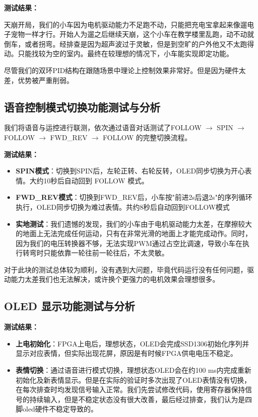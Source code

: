 \documentclass[12pt,a4paper]{ctexart}
\begin{document}
\textbf{测试结果：}

天崩开局，我们的小车因为电机驱动能力不足跑不动，只能把充电宝拿起来像遛电子宠物一样才行。开始人为遛之后继续天崩，这个小车在教学楼里乱跑，动不动就倒车，或者拐弯。经排查是因为超声波过于灵敏，但是到空旷的户外他又不太跑得动。只能找较为空的室内。最终在较理想的情况下，小车能实现即定功能。

尽管我们的双环PID结构在跟随场景中理论上控制效果非常好。但是因为硬件太差，优势被严重削弱。

\subsection{语音控制模式切换功能测试与分析}

我们将语音与运控进行联测，依次通过语音对话测试了FOLLOW $\to$ SPIN $\to$ FOLLOW $\to$ FWD\_REV $\to$ FOLLOW 的完整切换流程。

\textbf{测试结果：}
\begin{itemize}
    \item \textbf{SPIN模式}：切换到SPIN后，左轮正转、右轮反转，OLED同步切换为开心表情。大约10秒后自动回到 FOLLOW 模式。
    \item \textbf{FWD\_REV模式}：切换到FWD\_REV后，小车按"前进2s后退2s"的序列循环执行，OLED同步切换为难过表情。共约8秒后自动回到FOLLOW模式
    \item \textbf{实地测试}：我们遗憾的发现，我们的小车由于电机驱动能力太差，在摩擦较大的地面上无法完成任何运动，只有在非常光滑的地面上才能完成动作。同时，因为我们的电压转换器不够，无法实现PWM通过占空比调速，导致小车在执行转弯时只能依靠一轮往前一轮往后，不太灵敏。
\end{itemize}

对于此块的测试总体较为顺利，没有遇到大问题，毕竟代码运行没有任何问题，驱动能力太差我们也无法解决，或许换个更强力的电机效果会理想很多。

\subsection{OLED 显示功能测试与分析}

\textbf{测试结果：}
\begin{itemize}
    \item \textbf{上电初始化}：FPGA上电后，理想状态，OLED会完成SSD1306初始化序列并显示对应表情，但实际出现花屏，原因是有时候FPGA供电电压不稳定。
    \item \textbf{表情切换}：通过语音进行模式切换，理想状态OLED会在约100 ms内完成重新初始化及新表情显示。但是在实际的验证时多次出现了OLED表情没有切换，在每次排查时均发现信号输入正常。我们先尝试修改代码，使用寄存器保持信号的持续输入，但是不稳定状态没有很大改善，最后经过排查，我们认为是四脚oled硬件不稳定导致的。
\end{itemize}
\end{document}
